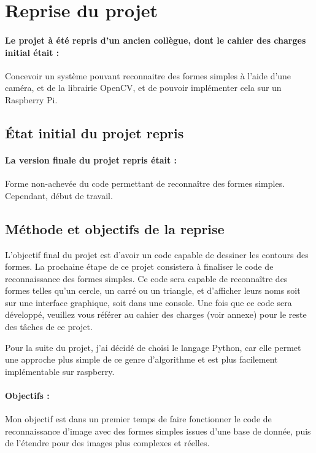 \section{Reprise du projet}
\paragraph{Le projet à été repris d'un ancien collègue, dont le cahier des charges initial était :}

Concevoir un système pouvant reconnaitre des formes simples à l’aide d’une caméra, et de la librairie OpenCV, et de pouvoir implémenter cela sur un Raspberry Pi.

\subsection{État initial du projet repris}
\paragraph{La version finale du projet repris était :} Forme non-achevée du code permettant de reconnaître des formes simples. Cependant, début de travail.

\subsection{Méthode et objectifs de la reprise}
L'objectif final du projet est d'avoir un code capable de dessiner les contours des formes.
La prochaine étape de ce projet consistera à finaliser le code de reconnaissance des formes simples. Ce code sera capable de reconnaître des formes telles qu'un cercle, un carré ou un triangle, et d'afficher leurs noms soit sur une interface graphique, soit dans une console.
Une fois que ce code sera développé, veuillez vous référer au cahier des charges (voir annexe) pour le reste des tâches de ce projet.

Pour la suite du projet, j'ai décidé de choisi le langage Python, car elle permet une approche plus simple de ce genre d'algorithme et est plus facilement implémentable sur raspberry.

\paragraph{Objectifs :}
Mon objectif est dans un premier temps de faire fonctionner le code de reconnaissance d'image avec des formes simples issues d'une base de donnée, puis de l'étendre pour des images plus complexes et réelles.


